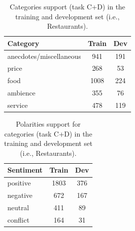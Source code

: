 \documentclass[11pt,a4paper]{article}
\begin{document}
	\begin{table}[H]
		\centering
		\begin{tabular}{@{}lcc@{}}
			\toprule
			\textbf{Category}         & Train     & Dev \\ \midrule
			anecdotes/miscellaneous   & 941       & 191     \\
			price                     & 268       & 53      \\
			food                      & 1008      & 224     \\
			ambience                  & 355       & 76      \\
			service                   & 478       & 119     \\ \bottomrule
		\end{tabular}
		\caption{Categories support (task C+D) in the training and development set
			(i.e., Restaurants).}
		\label{tab:cd_categories_support}
	\end{table}
	
	\begin{table}[H]
		\centering
		\begin{tabular}{@{}lcc@{}}
			\toprule
			\textbf{Sentiment} & Train & Dev \\ \midrule
			positive           & 1803  & 376 \\
			negative           & 672   & 167 \\
			neutral            & 411   & 89  \\
			conflict           & 164   & 31  \\ \bottomrule
		\end{tabular}
		\caption{Polarities support for categories (task C+D) in the training and
			development set (i.e., Restaurants).}
		\label{tab:cd_polarities_support}
	\end{table}
	
\end{document}
